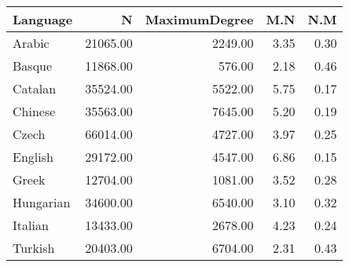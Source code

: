 \begin{table}[ht]
\centering
\begin{tabular}{lrrrr}
  \hline
Language & N & MaximumDegree & M.N & N.M \\ 
  \hline
Arabic & 21065.00 & 2249.00 & 3.35 & 0.30 \\ 
  Basque & 11868.00 & 576.00 & 2.18 & 0.46 \\ 
  Catalan & 35524.00 & 5522.00 & 5.75 & 0.17 \\ 
  Chinese & 35563.00 & 7645.00 & 5.20 & 0.19 \\ 
  Czech & 66014.00 & 4727.00 & 3.97 & 0.25 \\ 
  English & 29172.00 & 4547.00 & 6.86 & 0.15 \\ 
  Greek & 12704.00 & 1081.00 & 3.52 & 0.28 \\ 
  Hungarian & 34600.00 & 6540.00 & 3.10 & 0.32 \\ 
  Italian & 13433.00 & 2678.00 & 4.23 & 0.24 \\ 
  Turkish & 20403.00 & 6704.00 & 2.31 & 0.43 \\ 
   \hline
\end{tabular}
\end{table}

